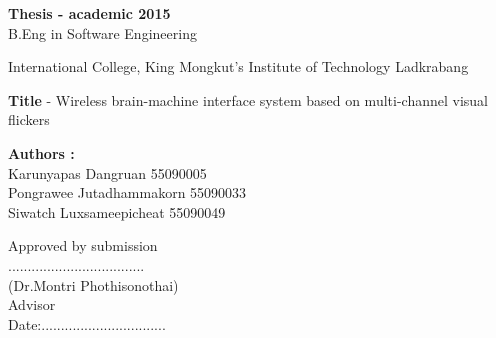 \begin{approve}
\textbf{Thesis - academic 2015}\\
B.Eng in Software Engineering

International College, King Mongkut's Institute of Technology Ladkrabang


\textbf{Title} - Wireless brain-machine interface system based on multi-channel visual flickers

\textbf{Authors :}\\

Karunyapas  Dangruan  55090005\\
Pongrawee  Jutadhammakorn 55090033\\
Siwatch  Luxsameepicheat  55090049\\
\begin{flushright}
Approved by submission\\
...................................\\
(Dr.Montri Phothisonothai)\\
Advisor\\

Date:................................\\
\end{flushright}


\end{approve}